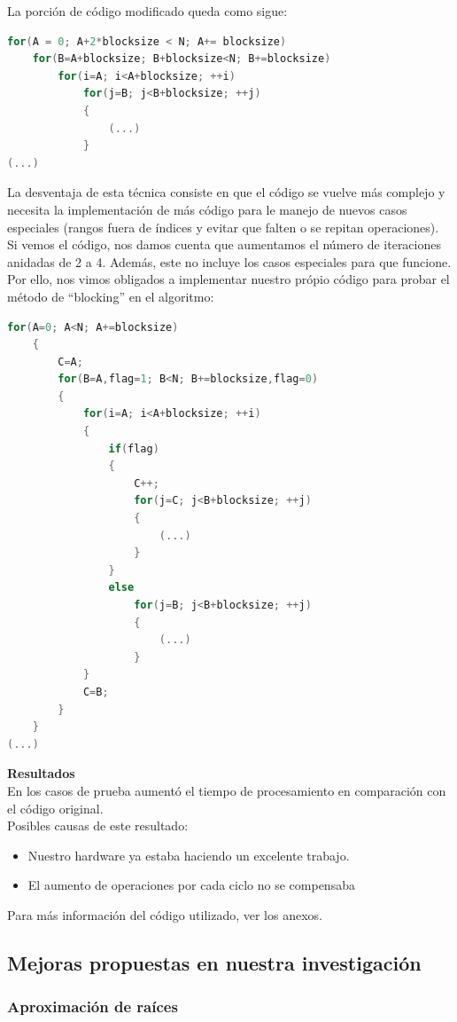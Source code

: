 La porción de código modificado queda como sigue:\\
\scriptsize
\begin{lstlisting}[language=C]
for(A = 0; A+2*blocksize < N; A+= blocksize)
	for(B=A+blocksize; B+blocksize<N; B+=blocksize)
		for(i=A; i<A+blocksize; ++i)
			for(j=B; j<B+blocksize; ++j)
			{
				(...)
			}
(...)
\end{lstlisting}
\normalsize
La desventaja de esta técnica consiste en que el código se vuelve más complejo y necesita la
implementación de más código para le manejo de nuevos casos especiales (rangos fuera de índices y evitar
que falten o se repitan operaciones).\\
 Si vemos el código, nos damos cuenta que aumentamos el número de iteraciones anidadas de 2 a 4.
Además, este no incluye los casos especiales para que funcione.\\

Por ello, nos vimos obligados a implementar nuestro própio código para probar el método de ``blocking''
en el algoritmo:
\scriptsize
\begin{lstlisting}[language=C]
	for(A=0; A<N; A+=blocksize)
	{
		C=A;
		for(B=A,flag=1; B<N; B+=blocksize,flag=0)
		{
			for(i=A; i<A+blocksize; ++i)
			{	
				if(flag)
				{
					C++;
					for(j=C; j<B+blocksize; ++j)
					{
						(...)
					}
				}
				else
					for(j=B; j<B+blocksize; ++j)
					{
						(...)
					}
			}
			C=B;
		}
	}
(...)
\end{lstlisting}
\normalsize


\textbf{Resultados}\\
En los casos de prueba  aumentó el tiempo de procesamiento en comparación con el código original.\\
Posibles causas de este resultado:
\begin{itemize}
        \item Nuestro hardware ya estaba haciendo un excelente trabajo.
        \item El aumento de operaciones por cada ciclo no se compensaba
\end{itemize}

Para más información del código utilizado, ver los anexos.

\subsection{Mejoras propuestas en nuestra investigación}
\subsubsection{Aproximación de raíces}

